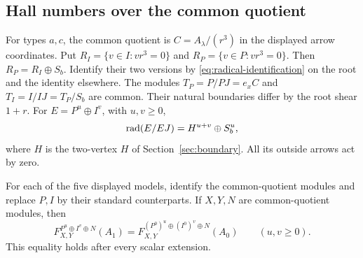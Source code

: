 \subsection{Hall numbers over the common quotient}
For types $a,c$, the common quotient is $C=A_\lambda/(r^3)$ in the displayed arrow coordinates. Put $R_I=\{v\in I:vr^3=0\}$ and $R_P=\{v\in P:vr^3=0\}$. Then $R_P=R_I\oplus S_b$. Identify their two versions by \eqref{eq:radical-identification} on the root and the identity elsewhere. The modules $T_P=P/PJ=e_xC$ and $T_I=I/IJ=T_P/S_b$ are common. Their natural boundaries differ by the root shear $1+r$. For $E=P^u\oplus I^v$, with $u,v\ge0$,
\[
 \operatorname{rad}(E/EJ)=H^{u+v}\oplus S_b^u,
\]
where $H$ is the two-vertex $H$ of Section~\ref{sec:boundary}. All its outside arrows act by zero.

\begin{lemma}\label{lem:attachment-comparison}
For each of the five displayed models, identify the common-quotient modules and replace $P,I$ by their standard counterparts. If $X,Y,N$ are common-quotient modules, then
\[
 F^{P^u\oplus I^v\oplus N}_{X,Y}(A_1)
 =F^{(P^0)^u\oplus(I^0)^v\oplus N}_{X,Y}(A_0)
 \qquad(u,v\ge0).
\]
This equality holds after every scalar extension.
\end{lemma}
